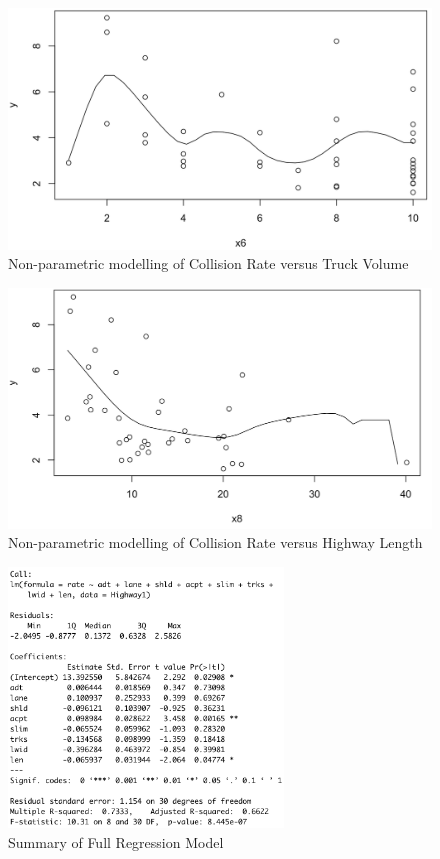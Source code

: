 \documentclass[12pt]{report}
\begin{document}
\begin{figure}[H]
    \centering
    \includegraphics[width=1\textwidth]{Non-parametric/Non-para x6.png}
    \caption{Non-parametric modelling of Collision Rate versus Truck Volume} \label{fig:NP6}
\end{figure}
\noindent

\begin{figure}[H]
    \centering
    \includegraphics[width=1\textwidth]{Non-parametric/Non-para x8.png}
    \caption{Non-parametric modelling of Collision Rate versus Highway Length} \label{fig:NP8}
\end{figure}
\noindent

\begin{figure}[H]
    \centering
    \includegraphics[width=0.65\textwidth]{Hypothesis tests/ST562 Full Model Sum.png}
    \caption{Summary of Full Regression Model} \label{fig:HT1}
\end{figure}
\noindent
\end{document}
